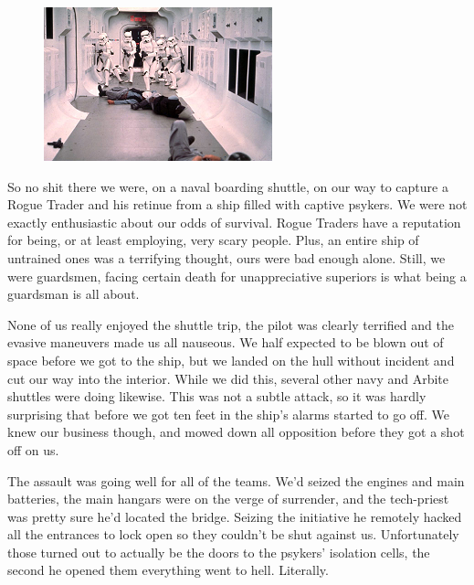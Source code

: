 \begin{figure}
\begin{center}
	\includegraphics[width=\figwidth]{pics/3/19.png}
\end{center}
\end{figure}
So no shit there we were, on a naval boarding shuttle, on our way to capture a Rogue Trader and his retinue from a ship filled with captive psykers. 
We were not exactly enthusiastic about our odds of survival. 
Rogue Traders have a reputation for being, or at least employing, very scary people. 
Plus, an entire ship of untrained ones was a terrifying thought, ours were bad enough alone. 
Still, we were guardsmen, facing certain death for unappreciative superiors is what being a guardsman is all about.

None of us really enjoyed the shuttle trip, the pilot was clearly terrified and the evasive maneuvers made us all nauseous. 
We half expected to be blown out of space before we got to the ship, but we landed on the hull without incident and cut our way into the interior. 
While we did this, several other navy and Arbite shuttles were doing likewise. 
This was not a subtle attack, so it was hardly surprising that before we got ten feet in the ship’s alarms started to go off.
We knew our business though, and mowed down all opposition before they got a shot off on us. 

The assault was going well for all of the teams. 
We’d seized the engines and main batteries, the main hangars were on the verge of surrender, and the tech-priest was pretty sure he’d located the bridge. 
Seizing the initiative he remotely hacked all the entrances to lock open so they couldn’t be shut against us.
Unfortunately those turned out to actually be the doors to the psykers’ isolation cells, the second he opened them everything went to hell. 
Literally.

